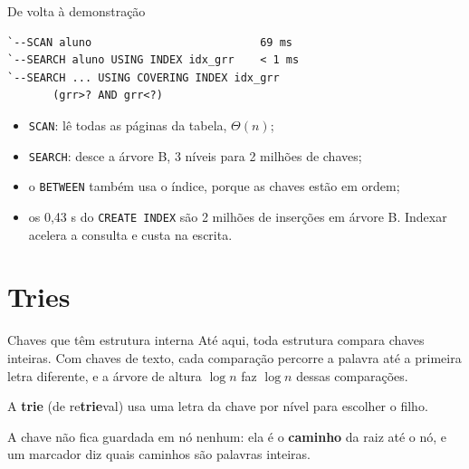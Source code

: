 \documentclass{beamer}
\begin{document}
\begin{frame}[fragile]{De volta à demonstração}
	\begin{verbatim}
`--SCAN aluno                          69 ms
`--SEARCH aluno USING INDEX idx_grr    < 1 ms
`--SEARCH ... USING COVERING INDEX idx_grr
       (grr>? AND grr<?)
\end{verbatim}

	\vspace{0.3cm}
	\begin{itemize}
		\item \texttt{SCAN}: lê todas as páginas da tabela, $\Theta(n)$;
		\item \texttt{SEARCH}: desce a árvore B, 3 níveis para 2 milhões de chaves;
		\item o \texttt{BETWEEN} também usa o índice, porque as chaves estão em
		      ordem;
		\item os 0,43 s do \texttt{CREATE INDEX} são 2 milhões de inserções em
		      árvore B. Indexar acelera a consulta e custa na escrita.
	\end{itemize}
\end{frame}

\section{Tries}

\begin{frame}{Chaves que têm estrutura interna}
	Até aqui, toda estrutura compara chaves inteiras. Com chaves de texto, cada
	comparação percorre a palavra até a primeira letra diferente, e a árvore de
	altura $\log n$ faz $\log n$ dessas comparações.

	\vspace{0.5cm}
	A \textbf{trie} (de re\textbf{trie}val) usa uma letra da chave por nível para
	escolher o filho.

	\vspace{0.3cm}
	A chave não fica guardada em nó nenhum: ela é o \textbf{caminho} da raiz até o
	nó, e um marcador diz quais caminhos são palavras inteiras.
\end{frame}
\end{document}
